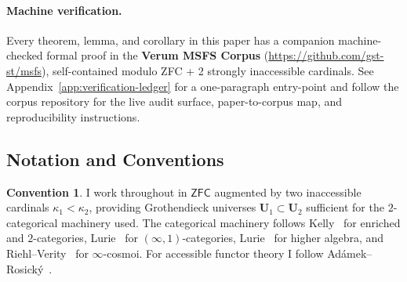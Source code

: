 \documentclass[11pt]{article}
\theoremstyle{plain}
\theoremstyle{definition}
\newtheorem{convention}[theorem]{Convention}
\newcommand{\ZFC}{\mathsf{ZFC}}
\begin{document}
\paragraph{Machine verification.}  Every theorem, lemma, and corollary in this paper has a companion machine-checked formal proof in the \textbf{Verum MSFS Corpus} (\url{https://github.com/gst-st/msfs}), self-contained modulo ZFC + 2 strongly inaccessible cardinals.  See Appendix~\ref{app:verification-ledger} for a one-paragraph entry-point and follow the corpus repository for the live audit surface, paper-to-corpus map, and reproducibility instructions.

\subsection{Notation and Conventions}

\begin{convention}\label{conv:zfc-inacc}
I work throughout in $\ZFC$ augmented by two inaccessible cardinals $\kappa_1 < \kappa_2$, providing Grothendieck universes $\mathbf{U}_1 \subset \mathbf{U}_2$ sufficient for the $2$-categorical machinery used. The categorical machinery follows Kelly~\cite{Kelly1982} for enriched and $2$-categories, Lurie~\cite{LurieHTT} for $(\infty, 1)$-categories, Lurie~\cite{LurieHA} for higher algebra, and Riehl--Verity~\cite{RiehlVerity2022} for $\infty$-cosmoi. For accessible functor theory I follow Ad\'amek--Rosick\'y~\cite{AdamekRosicky1994}.
\end{convention}
\end{document}
